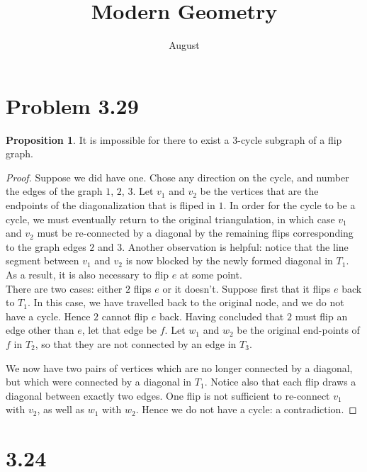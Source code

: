 \documentclass[12pt]{article}
\title{Modern Geometry}
\author{August}
\theoremstyle{definition}
\newtheorem{proposition}{Proposition}
\begin{document}
\maketitle

\section{Problem 3.29}

\begin{proposition}

It is impossible for there to exist a 3-cycle subgraph of a flip graph.
\end{proposition}

\begin{proof}
Suppose we did have one. Chose any direction on the cycle, and number the edges of the graph $1$, $2$, $3$. Let $v_1$ and $v_2$ be the vertices that are the endpoints of the diagonalization that is fliped in $1$. In order for the cycle to be a cycle, we must eventually return to the original triangulation, in which case $v_1$ and $v_2$ must be re-connected by a diagonal by the remaining flips corresponding to the graph edges $2$ and $3$. Another observation is helpful: notice that the line segment between $v_1$ and $v_2$ is now blocked by the newly formed diagonal in $T_1$. As a result, it is also necessary to flip $e$ at some point. \\

There are two cases: either $2$ flips $e$ or it doesn't. Suppose first that it flips $e$ back to $T_1$. In this case, we have travelled back to the original node, and we do not have a cycle. Hence $2$ cannot flip $e$ back. Having concluded that $2$ must flip an edge other than $e$, let that edge be $f$. Let $w_1$ and $w_2$ be the original end-points of $f$ in $T_2$, so that they are not connected by an edge in $T_3$. 

We now have two pairs of vertices which are no longer connected by a diagonal, but which were connected by a diagonal in $T_1$. Notice also that each flip draws a diagonal between exactly two edges. One flip is not sufficient to re-connect $v_1$ with $v_2$, as well as $w_1$ with $w_2$. Hence we do not have a cycle: a contradiction.


\end{proof}

\section{3.24}
\end{document}
